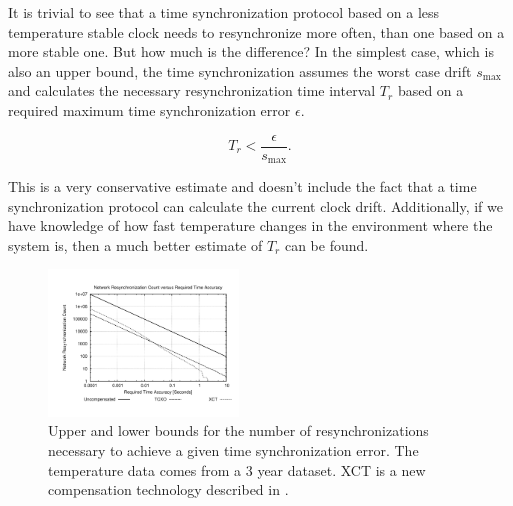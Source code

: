 It is trivial to see that a time synchronization protocol based on a less
temperature stable clock needs to resynchronize more often, than one
based on a more stable one. But how much is the difference? In the simplest
case, which is also an upper bound, the time synchronization assumes the worst
case drift $s_{\max}$ and calculates the necessary resynchronization time
interval $T_r$ based on a required maximum time synchronization error
$\epsilon$.

\begin{equation}
    T_r < \frac{\epsilon}{s_{\max}}.
\end{equation}

This is a very conservative estimate and doesn't include the fact that a time
synchronization protocol can calculate the current clock drift. Additionally,
if we have knowledge of how fast temperature changes in the environment where
the system is, then a much better estimate of $T_r$ can be found. 

\begin{figure}
    \begin{center}
        \includegraphics[angle=-90,width=0.45\textwidth]{figures/mosscamresync}
        \caption{Upper and lower bounds for the number of resynchronizations
        necessary to achieve a given time synchronization error. The
        temperature data comes from a 3 year dataset. XCT is a new
        compensation technology described in \cite{schmid2008scxo}.}
        \label{fig:resync}
    \end{center}
\end{figure}

